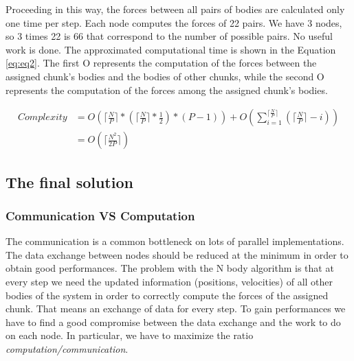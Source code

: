 \documentclass[a4paper]{article}
\begin{document}
Proceeding in this way, the forces between all pairs of bodies are calculated only one time per step. Each node computes the forces of 22 pairs. We have 3 nodes, so 3 times 22 is 66 that correspond to the number of possible pairs. No useful work is done. The approximated computational time is shown in the Equation \ref{eq:eq2}. The first O represents the computation of the forces between the assigned chunk's bodies and the bodies of other chunks, while the second O represents the computation of the forces among the assigned chunk's bodies.

\begin{equation} \label{eq:eq2}
\begin{split}
Complexity & = O(\lceil\frac{N}{P}\rceil * (\lceil\frac{N}{P}\rceil * \frac{1}{2}) * (P-1)) +  O(\sum_{i=1}^{\lceil\frac{N}{P}\rceil} {(\lceil\frac{N}{P}\rceil-i)})\\
 & = O(\lceil\frac{N^2}{2P}\rceil)
\end{split}
\end{equation}

\subsection{The final solution}
\label{sec:comm_comp}

\subsubsection{Communication VS Computation}
\label{sec:comm_comp}
The communication is a common bottleneck on lots of parallel implementations. The data exchange between nodes should be reduced at the minimum in order to obtain good performances. The problem with the N body algorithm is that at every step we need the updated information (positions, velocities) of all other bodies of the system in order to correctly compute the forces of the assigned chunk. That means an exchange of data for every step. To gain performances we have to find a good compromise between the data exchange and the work to do on each node. In particular, we have to maximize the ratio \textit{computation/communication}. 
\end{document}
